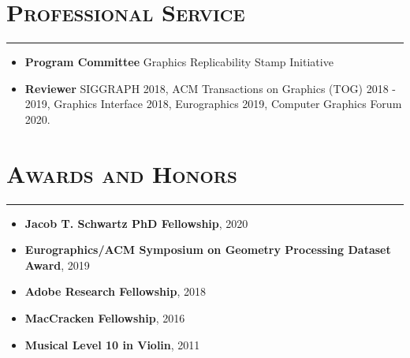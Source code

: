 \documentclass[letterpaper,11pt]{article}
\newcommand{\resheading}[1]{
\vspace{0pt}
\section*{\scshape #1}
\rule{\textwidth}{0.5pt}
  \vspace{-15pt}
}
\begin{document}
\resheading{Professional Service}
\vspace{-2pt}
\begin{itemize}[label=,leftmargin=*]
\item \textbf{Program Committee}
Graphics Replicability Stamp Initiative
\item \textbf{Reviewer}
SIGGRAPH 2018,
ACM Transactions on Graphics (TOG) 2018 - 2019,
Graphics Interface 2018, Eurographics 2019,
Computer Graphics Forum 2020.
\end{itemize}
\resheading{Awards and Honors}
	\vspace{-2pt}
\begin{itemize}[label=,leftmargin=*,itemsep=-1.5pt]
\item \textbf{Jacob T. Schwartz PhD Fellowship}, 2020\\
\item \textbf{Eurographics/ACM Symposium on Geometry Processing Dataset Award}, 2019 \\
\item \textbf{Adobe Research Fellowship}, 2018\\
\item
\textbf{MacCracken Fellowship}, 2016\\
\item
\textbf{Musical Level 10 in Violin}, 2011\\
\end{itemize}
\end{document}
